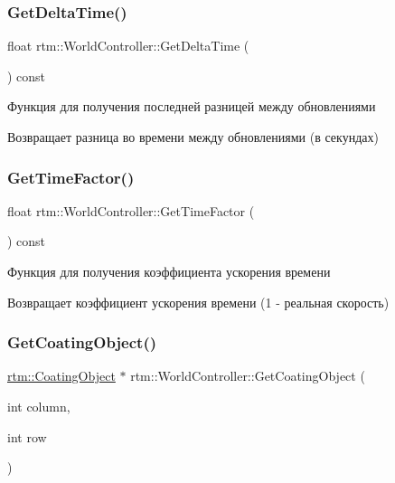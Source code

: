 \subsubsection{\texorpdfstring{Get\+Delta\+Time()}{GetDeltaTime()}}
{\footnotesize\ttfamily float rtm\+::\+World\+Controller\+::\+Get\+Delta\+Time (\begin{DoxyParamCaption}{ }\end{DoxyParamCaption}) const}



Функция для получения последней разницей между обновлениями 

\begin{DoxyReturn}{Возвращает}
разница во времени между обновлениями (в секундах) 
\end{DoxyReturn}
\mbox{\label{classrtm_1_1_world_controller_a97ccb5133bc7c0617affe4d947265370}} 
\subsubsection{\texorpdfstring{Get\+Time\+Factor()}{GetTimeFactor()}}
{\footnotesize\ttfamily float rtm\+::\+World\+Controller\+::\+Get\+Time\+Factor (\begin{DoxyParamCaption}{ }\end{DoxyParamCaption}) const}



Функция для получения коэффициента ускорения времени 

\begin{DoxyReturn}{Возвращает}
коэффициент ускорения времени (1 -\/ реальная скорость) 
\end{DoxyReturn}
\mbox{\label{classrtm_1_1_world_controller_ab2b9d9d1451820fcbbe7107deed6e4cf}} 
\subsubsection{\texorpdfstring{Get\+Coating\+Object()}{GetCoatingObject()}}
{\footnotesize\ttfamily \hyperlink{classrtm_1_1_coating_object}{rtm\+::\+Coating\+Object} $\ast$ rtm\+::\+World\+Controller\+::\+Get\+Coating\+Object (\begin{DoxyParamCaption}\item[{int}]{column,  }\item[{int}]{row }\end{DoxyParamCaption})}



